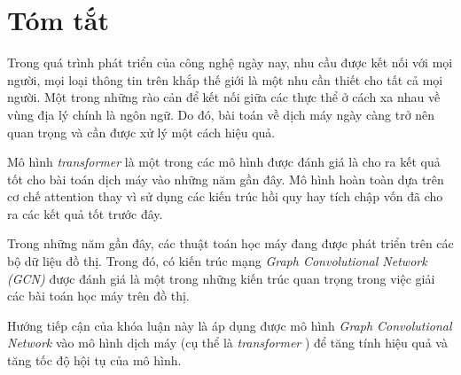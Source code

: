 \chapter*{Tóm tắt}
\label{abstract}

Trong quá trình phát triển của công nghệ ngày nay, nhu cầu được kết nối với mọi người, mọi loại thông tin trên khắp thế giới là một nhu cần thiết cho tất cả mọi người. Một trong những rào cản để kết nối giữa các thực thể ở cách xa nhau về vùng địa lý chính là ngôn ngữ. Do đó, bài toán về dịch máy ngày càng trở nên quan trọng và cần được xử lý một cách hiệu quả.

Mô hình \textit{ \textit{transformer} } là một trong các mô hình được đánh giá là cho ra kết quả tốt cho bài toán dịch máy vào những năm gần đây. Mô hình hoàn toàn dựa trên cơ chế attention thay vì sử dụng các kiến trúc hồi quy hay tích chập vốn đã cho ra các kết quả tốt trước đây.

Trong những năm gần đây, các thuật toán học máy đang được phát triển trên các bộ dữ liệu đồ thị. Trong đó, có kiến trúc mạng \textit{Graph Convolutional Network (GCN)} được đánh giá là một trong những kiến trúc quan trọng trong việc giải các bài toán học máy trên đồ thị. 

Hướng tiếp cận của khóa luận này là áp dụng được mô hình \textit{Graph Convolutional Network} vào mô hình dịch máy (cụ thể là \textit{ \textit{transformer} }) để tăng tính hiệu quả và tăng tốc độ hội tụ của mô hình.